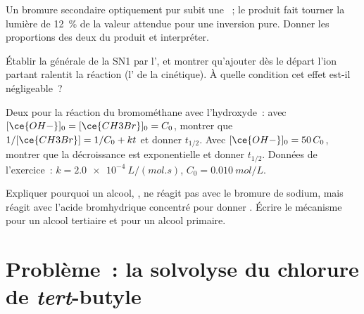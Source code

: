 \begin{exercise}[$\star\star$]\label{exo:b1:nucleophilic-substitution:9}
Un bromure secondaire optiquement pur subit une ~; le produit
fait tourner la lumière de \qty{12}{\percent} de la valeur attendue pour
une inversion pure. Donner les proportions des deux  du
produit et interpréter.
\end{exercise}

\begin{exercise}[$\star\star\star$]\label{exo:b1:nucleophilic-substitution:10}
Établir la  générale de la SN1 par l', et montrer qu'ajouter dès le départ l'ion
partant  ralentit la réaction (l' de la
cinétique). À quelle condition cet effet est-il négligeable~?
\end{exercise}

\begin{exercise}[$\star\star\star$]\label{exo:b1:nucleophilic-substitution:11}
Deux  pour la réaction du bromométhane avec
l'hydroxyde~: avec $[\ce{OH-}]_0 = [\ce{CH3Br}]_0 = C_0$, montrer que
$1/[\ce{CH3Br}] = 1/C_0 +
kt$ et donner $t_{1/2}$. Avec $[\ce{OH-}]_0 = 50\,C_0$, montrer que la
décroissance est exponentielle et donner $t_{1/2}$. Données de
l'exercice~: $k =
\qty{2.0e-4}{L/(mol.s)}$, $C_0 = \qty{0.010}{mol/L}$.
\end{exercise}

\begin{exercise}[$\star\star\star$]\label{exo:b1:nucleophilic-substitution:12}
Expliquer pourquoi un alcool, , ne réagit pas avec le bromure de
sodium, mais réagit avec l'acide bromhydrique concentré pour donner
. Écrire le mécanisme pour un alcool tertiaire et pour un alcool
primaire.
\end{exercise}

\section{Problème~: la solvolyse du chlorure de \textit{tert}-butyle}

